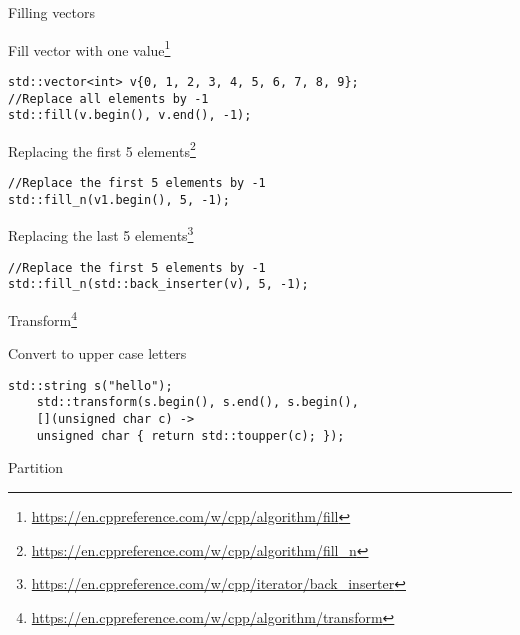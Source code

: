 \documentclass[12pt,t]{beamer}
\begin{document}
\begin{frame}[fragile]{Filling vectors}

\begin{block}{Fill vector with one value\footnote{\tiny\url{https://en.cppreference.com/w/cpp/algorithm/fill}}}
\begin{lstlisting}
std::vector<int> v{0, 1, 2, 3, 4, 5, 6, 7, 8, 9};
//Replace all elements by -1
std::fill(v.begin(), v.end(), -1);
\end{lstlisting}
\end{block}

\begin{block}{Replacing the first 5 elements\footnote{\tiny\url{https://en.cppreference.com/w/cpp/algorithm/fill_n}}}
\begin{lstlisting}
//Replace the first 5 elements by -1
std::fill_n(v1.begin(), 5, -1);
\end{lstlisting}
\end{block}

\begin{block}{Replacing the last 5 elements\footnote{\tiny\url{https://en.cppreference.com/w/cpp/iterator/back_inserter}}}
\begin{lstlisting}
//Replace the first 5 elements by -1
std::fill_n(std::back_inserter(v), 5, -1);
\end{lstlisting}
\end{block}

\end{frame}


\begin{frame}[fragile]{Transform\footnote{\tiny\url{https://en.cppreference.com/w/cpp/algorithm/transform}}}

\begin{block}{Convert to upper case letters}
\begin{lstlisting}
std::string s("hello");
    std::transform(s.begin(), s.end(), s.begin(),
    [](unsigned char c) -> 
    unsigned char { return std::toupper(c); });
\end{lstlisting}
\end{block}


\end{frame}

\begin{frame}{Partition}



\end{frame}
\end{document}
